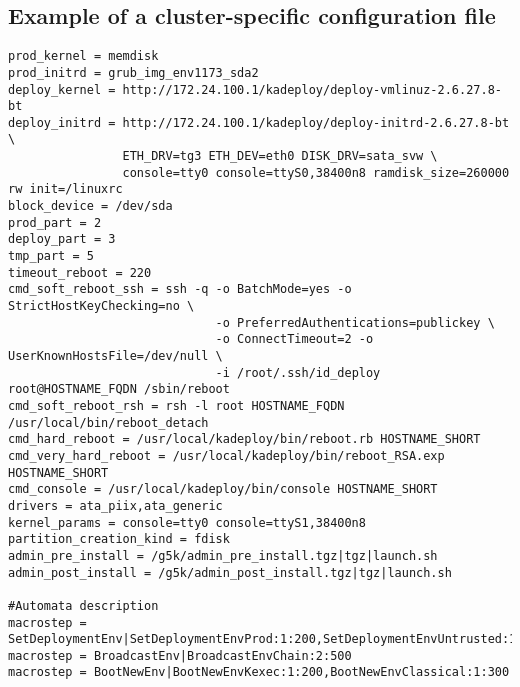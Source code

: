 \documentclass[a4wide,10pt,oneside]{book}
\begin{document}
\subsection{Example of a cluster-specific configuration file}
\begin{small}
\begin{verbatim}
prod_kernel = memdisk
prod_initrd = grub_img_env1173_sda2
deploy_kernel = http://172.24.100.1/kadeploy/deploy-vmlinuz-2.6.27.8-bt
deploy_initrd = http://172.24.100.1/kadeploy/deploy-initrd-2.6.27.8-bt \
                ETH_DRV=tg3 ETH_DEV=eth0 DISK_DRV=sata_svw \
                console=tty0 console=ttyS0,38400n8 ramdisk_size=260000 rw init=/linuxrc
block_device = /dev/sda
prod_part = 2
deploy_part = 3
tmp_part = 5
timeout_reboot = 220
cmd_soft_reboot_ssh = ssh -q -o BatchMode=yes -o StrictHostKeyChecking=no \
                             -o PreferredAuthentications=publickey \
                             -o ConnectTimeout=2 -o UserKnownHostsFile=/dev/null \
                             -i /root/.ssh/id_deploy root@HOSTNAME_FQDN /sbin/reboot
cmd_soft_reboot_rsh = rsh -l root HOSTNAME_FQDN /usr/local/bin/reboot_detach
cmd_hard_reboot = /usr/local/kadeploy/bin/reboot.rb HOSTNAME_SHORT
cmd_very_hard_reboot = /usr/local/kadeploy/bin/reboot_RSA.exp HOSTNAME_SHORT
cmd_console = /usr/local/kadeploy/bin/console HOSTNAME_SHORT
drivers = ata_piix,ata_generic
kernel_params = console=tty0 console=ttyS1,38400n8
partition_creation_kind = fdisk
admin_pre_install = /g5k/admin_pre_install.tgz|tgz|launch.sh
admin_post_install = /g5k/admin_post_install.tgz|tgz|launch.sh

#Automata description
macrostep = SetDeploymentEnv|SetDeploymentEnvProd:1:200,SetDeploymentEnvUntrusted:1:400
macrostep = BroadcastEnv|BroadcastEnvChain:2:500
macrostep = BootNewEnv|BootNewEnvKexec:1:200,BootNewEnvClassical:1:300
\end{verbatim}
\end{small}
\end{document}
